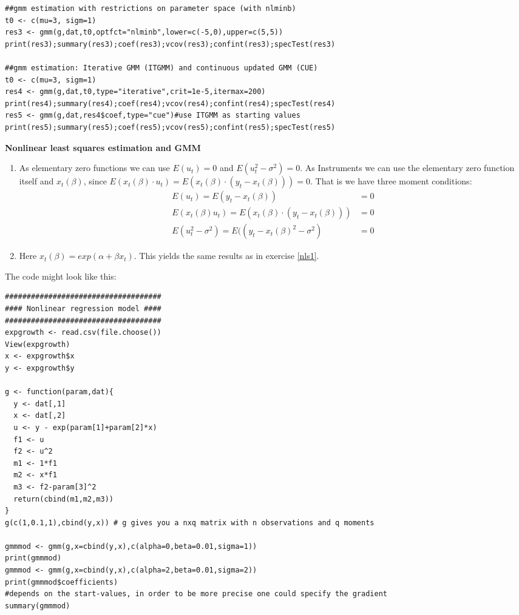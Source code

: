 \begin{Solution}{14.1}
\begin{verbatim}
##gmm estimation with restrictions on parameter space (with nlminb)
t0 <- c(mu=3, sigm=1)
res3 <- gmm(g,dat,t0,optfct="nlminb",lower=c(-5,0),upper=c(5,5))
print(res3);summary(res3);coef(res3);vcov(res3);confint(res3);specTest(res3)

##gmm estimation: Iterative GMM (ITGMM) and continuous updated GMM (CUE)
t0 <- c(mu=3, sigm=1)
res4 <- gmm(g,dat,t0,type="iterative",crit=1e-5,itermax=200)
print(res4);summary(res4);coef(res4);vcov(res4);confint(res4);specTest(res4)
res5 <- gmm(g,dat,res4$coef,type="cue")#use ITGMM as starting values
print(res5);summary(res5);coef(res5);vcov(res5);confint(res5);specTest(res5)
\end{verbatim}
\end{Solution}
\begin{Solution}{14.2}
\textbf{Nonlinear least squares estimation and GMM}

\begin{enumerate}
  \item As elementary zero functions we can use $E(u_t)=0$ and $E(u_t^2-\sigma^2)=0$. As Instruments we can use the elementary zero function itself and $x_t(\beta)$, since $E(x_t(\beta)\cdot u_t)=E(x_t(\beta)\cdot (y_t-x_t(\beta)))=0$. That is we have three moment conditions:
      \begin{align*}
      E(u_t) = E(y_t-x_t(\beta)) &= 0\\
      E(x_t(\beta) u_t) = E(x_t(\beta)\cdot (y_t-x_t(\beta)))&= 0\\
      E(u_t^2-\sigma^2) = E((y_t-x_t(\beta)^2-\sigma^2) &=0
      \end{align*}
  \item Here $x_t(\beta)=exp(\alpha+\beta x_t)$. This yields the same results as in exercise \ref{nls1}.
\end{enumerate}
The code might look like this:
\begin{verbatim}
####################################
#### Nonlinear regression model ####
####################################
expgrowth <- read.csv(file.choose())
View(expgrowth)
x <- expgrowth$x
y <- expgrowth$y

g <- function(param,dat){
  y <- dat[,1]
  x <- dat[,2]
  u <- y - exp(param[1]+param[2]*x)
  f1 <- u
  f2 <- u^2
  m1 <- 1*f1
  m2 <- x*f1
  m3 <- f2-param[3]^2
  return(cbind(m1,m2,m3))
}
g(c(1,0.1,1),cbind(y,x)) # g gives you a nxq matrix with n observations and q moments

gmmmod <- gmm(g,x=cbind(y,x),c(alpha=0,beta=0.01,sigma=1))
print(gmmmod)
gmmmod <- gmm(g,x=cbind(y,x),c(alpha=2,beta=0.01,sigma=2))
print(gmmmod$coefficients)
#depends on the start-values, in order to be more precise one could specify the gradient
summary(gmmmod)
\end{verbatim}
\end{Solution}
